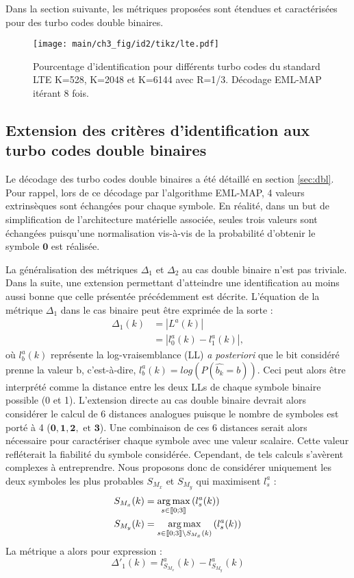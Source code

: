 Dans la section suivante, les métriques proposées sont étendues et caractérisées pour des turbo codes double 
binaires.

\begin{figure}[!h]
	\centering
	\hspace*{-1cm}
	\texttt{[image: main/ch3\_fig/id2/tikz/lte.pdf]}
	\caption{Pourcentage d'identification pour différents turbo codes du standard LTE K=528, K=2048 et K=6144 avec R=1/3.
	Décodage EML-MAP itérant 8 fois. \label{fig:idLTE}}
\end{figure}

\subsection{Extension des critères d'identification aux turbo codes double binaires}
Le décodage des turbo codes double binaires a été détaillé en section \ref{sec:dbl}. Pour rappel, lors de ce décodage par
l'algorithme EML-MAP, 4 valeurs extrinsèques sont échangées pour chaque symbole. En réalité, dans un but de simplification de 
l'architecture matérielle associée, seules trois valeurs sont échangées puisqu'une normalisation vis-à-vis de 
la probabilité d'obtenir le symbole $\mathbf{0}$ est réalisée. 

La généralisation des métriques $\Delta_1$ et $\Delta_2$ au cas double binaire n'est pas triviale. Dans la suite, une 
extension permettant d'atteindre une identification au moins aussi bonne que celle présentée précédemment est décrite.
L'équation de la métrique $\Delta_1$ dans le cas binaire peut être exprimée de la sorte : 
\begin{align*}
\Delta_1(k) &= |L^a(k)|\\
			&= |l^a_0(k)-l^a_1(k)|,
\end{align*}
où $l^a_b(k)$ représente la log-vraisemblance (LL) \textit{a posteriori} que le bit considéré prenne la valeur b, 
c'est-à-dire, 
$l^a_b(k) = log\left(P(\hat{b_k} = b)\right)$. Ceci peut alors être interprété comme la distance entre les deux LLs de chaque 
symbole
binaire possible (0 et 1). L'extension directe au cas double binaire devrait alors considérer le calcul de 6 distances 
analogues puisque le
nombre de symboles est porté à 4 ($\mathbf{0}, \mathbf{1}, \mathbf{2}, \text{~et~} \mathbf{3}$). Une combinaison 
de ces 6 distances serait alors nécessaire pour caractériser chaque symbole avec une valeur scalaire. Cette valeur 
refléterait la fiabilité du symbole considérée. Cependant, de tels calculs s'avèrent complexes à entreprendre. Nous proposons
donc de considérer uniquement les deux symboles les plus probables $S_{M_x}$ et $S_{M_y}$ qui maximisent $l^a_s$ :
\begin{align*}
S_{M_x}(k) &= \operatorname*{arg\,max}\limits_{s\in\llbracket0;3\rrbracket}\left(l^a_s(k)\right) \\
S_{M_y}(k) &= \operatorname*{arg\,max}\limits_{s\in\llbracket0;3\rrbracket\setminus{S_{M_x}(k)}}\left(l^a_s(k)\right)
\end{align*}
La métrique a alors pour expression :
\begin{equation}
	\Delta'_1(k) = l^a_{S_{M_x}}(k)-l^a_{S_{M_y}}(k)
\end{equation}

